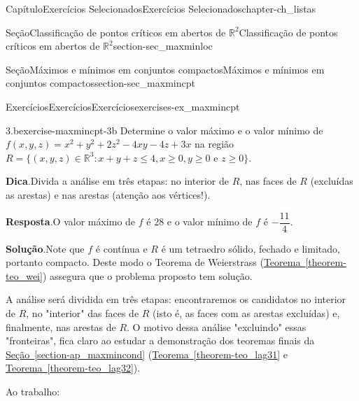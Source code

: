 \documentclass[oneside,10pt,]{book}
\newcommand{\blocktitlefont}{\relax}
\newcommand{\xreffont}{\relax}
\numberwithin{equation}{section}
\newcommand{\R}{\mathbb R}
\begin{document}
\begin{chapterptx}{Capítulo}{Exercícios Selecionados}{}{Exercícios Selecionados}{}{}{chapter-ch_listas}
\begin{sectionptx}{Seção}{Classificação de pontos críticos em abertos de \(\R^2\)}{}{Classificação de pontos críticos em abertos de \(\R^2\)}{}{}{section-sec_maxminloc}
\end{sectionptx}
%
%
\typeout{************************************************}
\typeout{************************************************}
%
\begin{sectionptx}{Seção}{Máximos e mínimos em conjuntos compactos}{}{Máximos e mínimos em conjuntos compactos}{}{}{section-sec_maxmincpt}
%
%
\typeout{************************************************}
\typeout{************************************************}
%
\begin{exercises-subsection-numberless}{Exercícios}{Exercícios}{}{Exercícios}{}{}{exercises-ex_maxmincpt}
\begin{divisionexercise}{3.b}{}{}{exercise-maxmincpt-3b}%
Determine o valor máximo e o valor mínimo de \(f(x,y,z) =
x^2 + y^2 +2z^2 -4xy -4z + 3x\) na região \(R = \big\{(x,y,z)
\in \R^3\colon x+y+z \leq 4, x\geq 0, y\geq 0\text{ e }
z\geq0\big\}\).%
\par\smallskip%
\noindent\textbf{\blocktitlefont Dica}.\hypertarget{hint-maxmincpt-3b-b}{}\quad{}Divida a análise em três etapas: no interior de \(R\), nas faces de \(R\) (excluídas as arestas) e nas arestas (atenção aos vértices!).%
\par\smallskip%
\noindent\textbf{\blocktitlefont Resposta}.\hypertarget{answer-maxmincpt-3b-c}{}\quad{}O valor máximo de \(f\) é \(28\) e o valor mínimo de \(f\) é \(-\dfrac{11}{4}\).%
\par\smallskip%
\noindent\textbf{\blocktitlefont Solução}.\hypertarget{solution-maxmincpt-3b-d}{}\quad{}Note que \(f\) é contínua e \(R\) é um tetraedro sólido, fechado e limitado, portanto compacto. Deste modo o Teorema de Weierstrass (\hyperref[theorem-teo_wei]{Teorema~{\xreffont\ref{theorem-teo_wei}}}) assegura que o problema proposto tem solução.%
\par
A análise será dividida em três etapas: encontraremos os candidatos no interior de \(R\), no "interior" das faces de \(R\) (isto é, as faces com as arestas excluídas) e, finalmente, nas arestas de \(R\). O motivo dessa análise "excluindo" essas "fronteiras", fica claro ao estudar a demonstração dos teoremas finais da \hyperref[section-ap_maxmincond]{Seção~{\xreffont\ref{section-ap_maxmincond}}} (\hyperref[theorem-teo_lag31]{Teorema~{\xreffont\ref{theorem-teo_lag31}}} e \hyperref[theorem-teo_lag32]{Teorema~{\xreffont\ref{theorem-teo_lag32}}}).%
\par
Ao trabalho:%
\begin{itemize}[label=\textbullet]

\end{itemize}
\end{divisionexercise}
\end{exercises-subsection-numberless}
\end{sectionptx}
\end{chapterptx}
\end{document}
